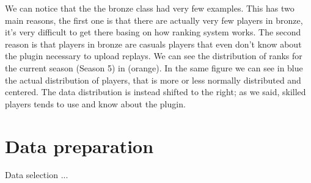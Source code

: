 We can notice that the the bronze class had very few examples. This has two main reasons, the first one is that there are actually very few players in bronze, it's very difficult to get there basing on how ranking system works. The second reason is that players in bronze are casuals players that even don't know about the plugin necessary to upload replays. We can see the distribution of ranks for the current season (Season 5) in  (orange). In the same figure we can see in blue the actual distribution of players, that is more or less normally distributed and centered. The data distribution is instead shifted to the right; as we said, skilled players tends to use and know about the plugin.

\section{Data preparation}

Data selection ... 